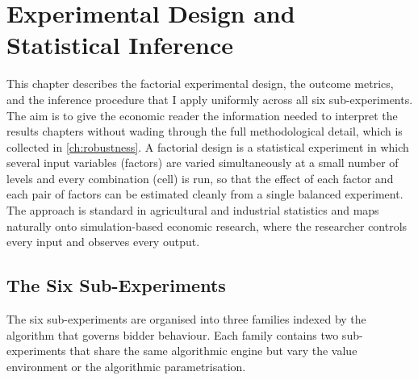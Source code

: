 \chapter{Experimental Design and Statistical Inference}
\label{ch:design_and_inference}

This chapter describes the factorial experimental design, the outcome metrics, and the inference procedure that I apply uniformly across all six sub-experiments. The aim is to give the economic reader the information needed to interpret the results chapters without wading through the full methodological detail, which is collected in \cref{ch:robustness}. A factorial design is a statistical experiment in which several input variables (factors) are varied simultaneously at a small number of levels and every combination (cell) is run, so that the effect of each factor and each pair of factors can be estimated cleanly from a single balanced experiment. The approach is standard in agricultural and industrial statistics \citep{Box2005, Montgomery2017} and maps naturally onto simulation-based economic research, where the researcher controls every input and observes every output.

\section{The Six Sub-Experiments}
\label{sec:experiments_overview}

The six sub-experiments are organised into three families indexed by the algorithm that governs bidder behaviour. Each family contains two sub-experiments that share the same algorithmic engine but vary the value environment or the algorithmic parametrisation.

